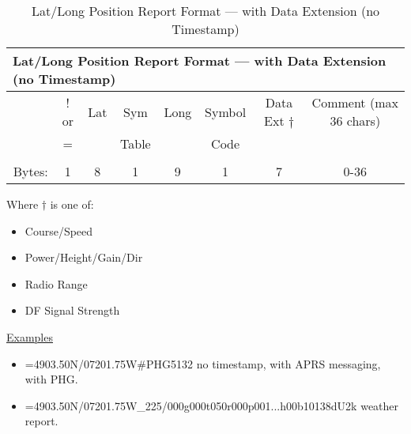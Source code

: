 \begin{table}[H]
  
  \begin{tabular}{r|c|c|c|c|c|c|c|}
    \hline
    \multicolumn{8}{l}{Lat/Long Position Report Format — with Data Extension (no Timestamp)} \\
    \hline 
    & ! or & Lat & Sym    & Long & Symbol & Data Ext $\dagger$ & Comment (max 36 chars) \\
    & =    &     & Table  &      & Code   &       & \\
    &      &     &        &      &        &       & \\
    \hline
    Bytes: & 1 & 8 & 1 & 9 & 1 & 7 & 0-36  \\
    \hline
        
  \end{tabular}
  \vspace{2em}
  
  Where $\dagger$ is one of:
  \begin{itemize}
  \item Course/Speed
  \item Power/Height/Gain/Dir
  \item Radio Range
  \item DF Signal Strength
  \end{itemize}

  \vspace {2em}
  
  \underline{Examples}
  \vspace{1em}
  
  \begin{itemize}
  \item[] =4903.50N/07201.75W\#PHG5132 \hspace{1ex} no timestamp, with APRS messaging, with PHG. 
  \item[] =4903.50N/07201.75W\_225/000g000t050r000p001...h00b10138dU2k \hspace{1ex} weather report.
  \end{itemize}

  \doublerule
  \caption{Lat/Long Position Report Format — with Data Extension (no Timestamp)}
\end{table}


